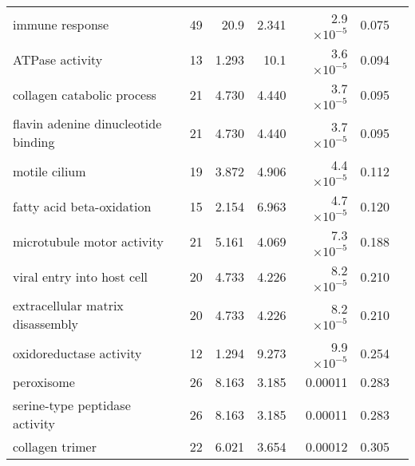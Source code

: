 \begin{longtable}{|l|r|r|r|r|r|}
                                   immune response &                      49 &                    20.9 &      2.341 &  2.9$\times 10^{-5}$ &                       0.075~~ \\
                                   ATPase activity &                      13 &                   1.293 &       10.1 &  3.6$\times 10^{-5}$ &                       0.094~~ \\
                        collagen catabolic process &                      21 &                   4.730 &      4.440 &  3.7$\times 10^{-5}$ &                       0.095~~ \\
               flavin adenine dinucleotide binding &                      21 &                   4.730 &      4.440 &  3.7$\times 10^{-5}$ &                       0.095~~ \\
                                     motile cilium &                      19 &                   3.872 &      4.906 &  4.4$\times 10^{-5}$ &                       0.112~~ \\
                         fatty acid beta-oxidation &                      15 &                   2.154 &      6.963 &  4.7$\times 10^{-5}$ &                       0.120~~ \\
                        microtubule motor activity &                      21 &                   5.161 &      4.069 &  7.3$\times 10^{-5}$ &                       0.188~~ \\
                        viral entry into host cell &                      20 &                   4.733 &      4.226 &  8.2$\times 10^{-5}$ &                       0.210~~ \\
                  extracellular matrix disassembly &                      20 &                   4.733 &      4.226 &  8.2$\times 10^{-5}$ &                       0.210~~ \\
                           oxidoreductase activity &                      12 &                   1.294 &      9.273 &  9.9$\times 10^{-5}$ &                       0.254~~ \\
                                        peroxisome &                      26 &                   8.163 &      3.185 &              0.00011 &                       0.283~~ \\
                    serine-type peptidase activity &                      26 &                   8.163 &      3.185 &              0.00011 &                       0.283~~ \\
                                   collagen trimer &                      22 &                   6.021 &      3.654 &              0.00012 &                       0.305~~ \\

\end{longtable}

